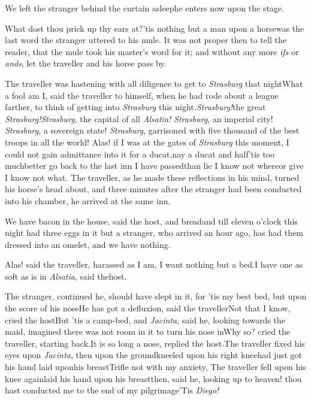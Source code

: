 \documentclass{article}
\begin{document}
We left the stranger behind the curtain asleep\tsk he
enters now upon the stage.

\tsk What dost thou prick up thy ears at?\tsk ’tis nothing
but a man upon a horse\tsk was the last word the stranger
uttered to his mule. It was not proper then to tell the
reader, that the mule took his master’s word for it; and
without any more \textit{ifs} or \textit{ands}, let the
traveller and his horse pass by.

The traveller was hastening with all diligence to get to
\textit{Strasburg} that night\break\tsk What a fool am I, said the
traveller to himself, when he had rode about a league farther,
to think of getting into \textit{Strasburg} this
night.\tsk \textit{Strasburg!}\tsk the great
\textit{Strasburg!}\tsk \textit{Strasburg}, the capital of all
\textit{Alsatia!} \textit{Strasburg}, an imperial city!
\textit{Strasburg}, a sovereign state! \textit{Strasburg}, garrisoned
with five thousand of the best troops in all the world!\tsk
Alas!\break
if I was at the gates of \textit{Strasburg} this moment, I could not
gain admittance into it for a ducat,\tsk nay a ducat and
half\tsk ’tis too much\tsk better go back to the last inn
I have passed\tsk than lie I know not
where\tsk or give I know not what. The traveller, as he
made these reflections in his mind, turned his horse’s head
about, and three minutes after the stranger had been conducted into
his chamber, he arrived at the same inn.

\tsk We have bacon in the house, said the host, and
bread\tsh and till eleven o’clock this night had
three eggs in it\tsk{}
but a stranger, who arrived an hour
ago, has had them dressed into an omelet, and we have
nothing.\tsh

\tsk Alas! said the traveller, harassed as I am, I want nothing but a
bed.\tsh I have one as soft as is in \textit{Alsatia}, said
the\break host.

\tsk The stranger, continued he, should have slept in
it, for ’tis my best bed, but upon the score of his
nose\tsk He has got a defluxion, said the
traveller\tsk Not that I know, cried the
host\tsk But ’tis a camp-bed, and \textit{Jacinta},
said he, looking towards the maid, imagined there was not room in
it to turn his nose in\tsk Why so? cried the traveller,
starting back.\tsk It is so long a nose, replied the
host.\tsk The traveller fixed his eyes upon
\textit{Jacinta}, then upon the ground\tsk kneeled upon his
right
knee\tsk had just got his hand laid upon\break his
breast\tsk Trifle not with my anxiety,
\break
\tsk The traveller fell
upon his knee again\tsk laid his hand upon his breast\tsk then,
said he, looking up to heaven! thou hast conducted me to the end of
my pilgrimage\break\tsh ’Tis \textit{Diego!}
\end{document}
